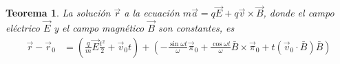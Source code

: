 \documentclass{article}
\newtheorem{theorem}{Teorema}
\begin{document}
  \begin{theorem}
    La solución \(\vec{r}\) a la ecuación \(m \vec{a} = q \vec{E} + q \vec{v} \times \vec{B}\), donde el campo eléctrico \(\vec{E}\) y el campo magnético \(\vec{B}\) son constantes, es
    \begin{align}
      \vec{r} - \vec{r}_0
      &=
      \left(
        \frac{q}{m} \vec{E} \frac{t^2}{2}
        + \vec{v}_0 t
      \right)
      +
      \left(
        - \frac{\sin \omega t}{\omega}
        \vec{\pi}_0
        + \frac{\cos \omega t}{\omega}
        \bar{B}
        \times
        \vec{\pi}_0
        + t (\vec{v}_0 \cdot \bar{B}) \bar{B}
      \right)
    \end{align}
    
  \end{theorem}
  
\end{document}
